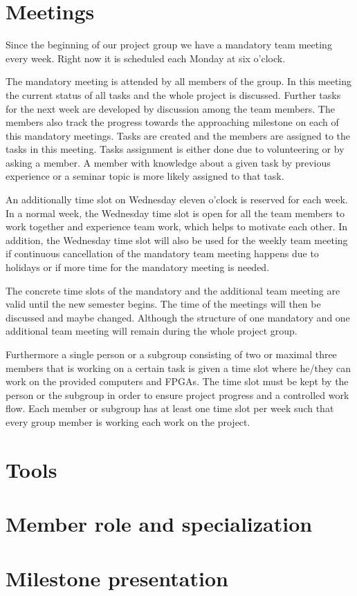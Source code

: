 \section{Meetings}
Since the beginning of our project group we have a mandatory team meeting every week.
Right now it is scheduled each Monday at six o'clock.

The mandatory meeting is attended by all members of the group.
In this meeting the current status of all tasks and the whole project is discussed.
Further tasks for the next week are developed by discussion among the team members.
The members also track the progress towards the approaching milestone on each of this mandatory meetings.
Tasks are created and the members are assigned to the tasks in this meeting. Tasks assignment is either done due to volunteering or by asking a member.
A member with knowledge about a given task by previous experience or a seminar topic is  more likely assigned to that task.

An additionally time slot on Wednesday eleven o'clock is reserved for each week.
In a normal week, the Wednesday time slot is open for all the team members to work together and experience team work, which helps to motivate each other.
In addition, the Wednesday time slot will also be used for the weekly team meeting if continuous cancellation of the mandatory team meeting happens due to holidays
or if more time for the mandatory meeting is needed.

The concrete time slots of the mandatory and the additional team meeting are valid until the new semester begins. The time of the meetings will then be discussed and maybe changed. Although the structure of one mandatory and one additional team meeting will remain during the whole project group.

Furthermore a single person or a subgroup consisting of two or maximal three members that is working on a certain task is given a time slot where he/they can work on the provided computers and \ac{FPGA}s.
The time slot must be kept by the person or the subgroup in order to ensure project progress and a controlled work flow.
Each member or subgroup has at least one time slot per week such that every group member is working each work on the project.

\section{Tools}

\section{Member role and specialization}

\section{Milestone presentation}